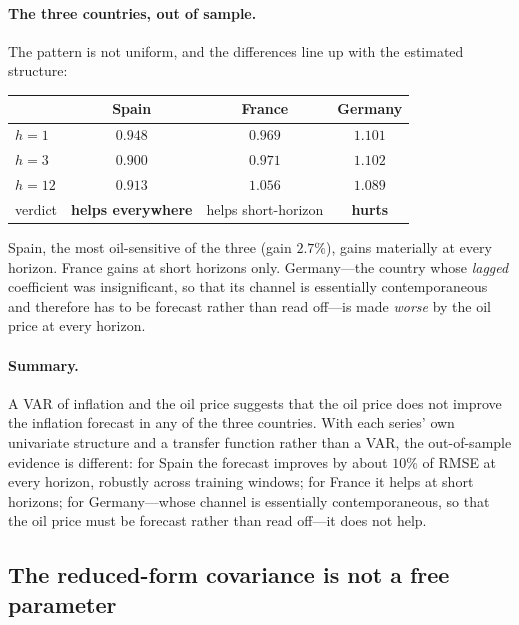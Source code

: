 \documentclass[11pt,a4paper]{article}
\theoremstyle{plain}
\theoremstyle{remark}
\begin{document}
\paragraph{The three countries, out of sample.} The pattern is not uniform, and the
differences line up with the estimated structure:

\begin{center}
\begin{tabular}{lccc}
\toprule
 & Spain & France & Germany \\
\midrule
$h=1$  & $0.948$ & $0.969$ & $1.101$ \\
$h=3$  & $0.900$ & $0.971$ & $1.102$ \\
$h=12$ & $0.913$ & $1.056$ & $1.089$ \\
\midrule
verdict & \textbf{helps everywhere} & helps short-horizon & \textbf{hurts} \\
\bottomrule
\end{tabular}
\end{center}

Spain, the most oil-sensitive of the three (gain $2.7\%$), gains materially at every
horizon. France gains at short horizons only. Germany---the country whose
\emph{lagged} coefficient was insignificant, so that its channel is essentially
contemporaneous and therefore has to be forecast rather than read off---is made
\emph{worse} by the oil price at every horizon.

\paragraph{Summary.} A VAR of inflation and the oil price suggests that the oil
price does not improve the inflation forecast in any of the three countries. With
each series' own univariate structure and a transfer function rather than a VAR,
the out-of-sample evidence is different: for Spain the forecast improves by about
$10\%$ of RMSE at every horizon, robustly across training windows; for France it
helps at short horizons; for Germany---whose channel is essentially contemporaneous,
so that the oil price must be forecast rather than read off---it does not help.


\subsection{The reduced-form covariance is not a free parameter}
\label{sec:embedcov}
\end{document}
